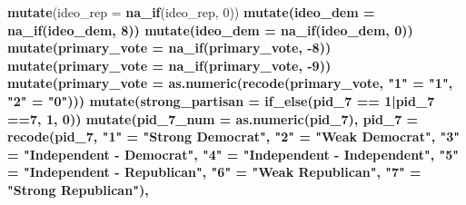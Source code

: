 \documentclass[
]{article}
\newenvironment{Shaded}{\begin{snugshade}}{\end{snugshade}}
\newcommand{\DataTypeTok}[1]{\textcolor[rgb]{0.13,0.29,0.53}{#1}}
\newcommand{\DecValTok}[1]{\textcolor[rgb]{0.00,0.00,0.81}{#1}}
\newcommand{\KeywordTok}[1]{\textcolor[rgb]{0.13,0.29,0.53}{\textbf{#1}}}
\newcommand{\NormalTok}[1]{#1}
\newcommand{\OperatorTok}[1]{\textcolor[rgb]{0.81,0.36,0.00}{\textbf{#1}}}
\newcommand{\StringTok}[1]{\textcolor[rgb]{0.31,0.60,0.02}{#1}}
\begin{document}
\begin{Shaded}
\begin{Highlighting}[]
{{{{{{{{{{{{{{{{{{{{{{{{{{{{{{{{{{{{{{{{{{{{{{{{{{{{{{{{{{{{{{{{{{{{{{{{{{{{{{{{{{{{{{{{{{{{{{{\StringTok{    }\KeywordTok{mutate}\NormalTok{(}\DataTypeTok{ideo_rep =} \KeywordTok{na_if}\NormalTok{(ideo_rep, }\DecValTok{0}\NormalTok{))}\OperatorTok{%>%}
\StringTok{    }\KeywordTok{mutate}\NormalTok{(}\DataTypeTok{ideo_dem =} \KeywordTok{na_if}\NormalTok{(ideo_dem, }\DecValTok{8}\NormalTok{))}\OperatorTok{%>%}
\StringTok{    }\KeywordTok{mutate}\NormalTok{(}\DataTypeTok{ideo_dem =} \KeywordTok{na_if}\NormalTok{(ideo_dem, }\DecValTok{0}\NormalTok{))}\OperatorTok{%>%}
\StringTok{    }\KeywordTok{mutate}\NormalTok{(}\DataTypeTok{primary_vote =} \KeywordTok{na_if}\NormalTok{(primary_vote, }\DecValTok{-8}\NormalTok{))}\OperatorTok{%>%}
\StringTok{    }\KeywordTok{mutate}\NormalTok{(}\DataTypeTok{primary_vote =} \KeywordTok{na_if}\NormalTok{(primary_vote, }\DecValTok{-9}\NormalTok{))}\OperatorTok{%>%}
\StringTok{    }\KeywordTok{mutate}\NormalTok{(}\DataTypeTok{primary_vote =} \KeywordTok{as.numeric}\NormalTok{(}\KeywordTok{recode}\NormalTok{(primary_vote, }
                                                                        \StringTok{"1"}\NormalTok{ =}\StringTok{ "1"}\NormalTok{,}
                                                                        \StringTok{"2"}\NormalTok{ =}\StringTok{ "0"}\NormalTok{)))}\OperatorTok{%>%}
\StringTok{    }\KeywordTok{mutate}\NormalTok{(}\DataTypeTok{strong_partisan =} \KeywordTok{if_else}\NormalTok{(pid_}\DecValTok{7} \OperatorTok{==}\StringTok{ }\DecValTok{1}\OperatorTok{|}\NormalTok{pid_}\DecValTok{7} \OperatorTok{==}\DecValTok{7}\NormalTok{, }\DecValTok{1}\NormalTok{, }\DecValTok{0}\NormalTok{))}\OperatorTok{%>%}
\StringTok{    }\KeywordTok{mutate}\NormalTok{(}\DataTypeTok{pid_7_num =} \KeywordTok{as.numeric}\NormalTok{(pid_}\DecValTok{7}\NormalTok{),}
                 \DataTypeTok{pid_7 =} \KeywordTok{recode}\NormalTok{(pid_}\DecValTok{7}\NormalTok{, }
                                             \StringTok{"1"}\NormalTok{ =}\StringTok{ "Strong Democrat"}\NormalTok{, }
                                             \StringTok{"2"}\NormalTok{ =}\StringTok{ "Weak Democrat"}\NormalTok{, }
                                             \StringTok{"3"}\NormalTok{ =}\StringTok{ "Independent - Democrat"}\NormalTok{, }
                                             \StringTok{"4"}\NormalTok{ =}\StringTok{ "Independent - Independent"}\NormalTok{, }
                                             \StringTok{"5"}\NormalTok{ =}\StringTok{ "Independent - Republican"}\NormalTok{, }
                                             \StringTok{"6"}\NormalTok{ =}\StringTok{ "Weak Republican"}\NormalTok{, }
                                             \StringTok{"7"}\NormalTok{ =}\StringTok{ "Strong Republican"}\NormalTok{),}
}}}}}}}}}}}}}}}}}}}}}}}}}}}}}}}}}}}}}}}}}}}}}}}}}}}}}}}}}}}}}}}}}}}}}}}}}}}}}}}}}}}}}}}}}}}}}}}}}}}}}}
\end{Highlighting}
\end{Shaded}
\end{document}
